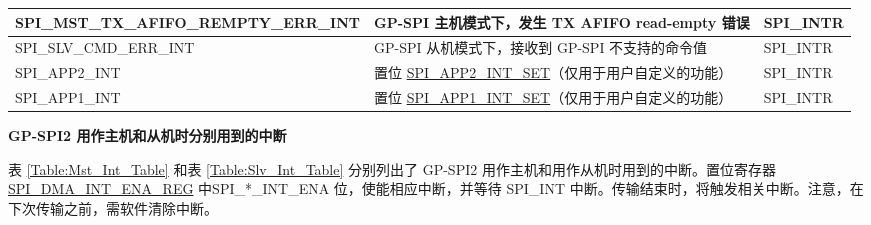 \documentclass[main\_\_CN.tex]{subfiles}
\begin{document}
\begin{longtable}{ | L{6cm} | L{8.5cm} | L{2.5cm} | }
\label{int:SPIMSTTXAFIFOREMPTYERRINT} SPI\_MST\_TX\_AFIFO\_REMPTY\_ERR\_INT &GP-SPI 主机模式下，发生 TX AFIFO read-empty 错误 & SPI\_INTR \\ \hline
\label{int:SPISLVCMDERRINT} SPI\_SLV\_CMD\_ERR\_INT & GP-SPI 从机模式下，接收到 GP-SPI 不支持的命令值 &SPI\_INTR \\ \hline
\label{int:SPIAPP2INT}SPI\_APP2\_INT & 置位 \hyperref[fielddesc:SPIAPP1INTSET]{SPI\_APP2\_INT\_SET}（仅用于用户自定义的功能）& SPI\_INTR \\ \hline
\label{int:SPIAPP1INT}SPI\_APP1\_INT & 置位 \hyperref[fielddesc:SPIAPP1INTSET]{SPI\_APP1\_INT\_SET}（仅用于用户自定义的功能）& SPI\_INTR \\ \hline
\end{longtable}

\textbf{GP-SPI2 用作主机和从机时分别用到的中断}

表  \ref{Table:Mst_Int_Table} 和表 \ref{Table:Slv_Int_Table} 分别列出了 GP-SPI2 用作主机和用作从机时用到的中断。置位寄存器 \hyperref[regdesc:SPIDMAINTENAREG]{SPI\_DMA\_INT\_ENA\_REG} 中SPI\_*\_INT\_ENA 位，使能相应中断，并等待 SPI\_INT 中断。传输结束时，将触发相关中断。注意，在下次传输之前，需软件清除中断。
\end{document}
